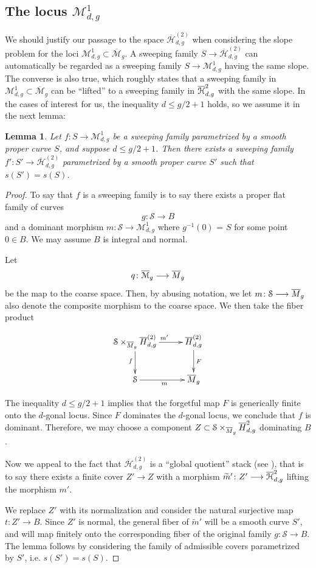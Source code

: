 \documentclass[reqno, 10 pt]{article}
\newtheorem{lem}[thm]{Lemma}
\theoremstyle{definition}
\theoremstyle{remark}
\numberwithin{equation}{section}
\numberwithin{thm}{section}
\numberwithin{prop}{section}
\numberwithin{lem}{section}
\numberwithin{cor}{section}
\numberwithin{conj}{section}
\numberwithin{defn}{section}
\newcommand{\M}{\mathcal M}
\renewcommand{\H}{\mathcal H}
\newcommand{\Hdgnt}{\overline{\H}_{d,g}^{(2)}}
\renewcommand{\to}{\longrightarrow}
\newcommand{\Mg}{{\overline{\mathcal{M}}_{g}}}
\newcommand{\cS}{{\mathcal S}}
\newcommand {\from}{{\colon}}
\renewcommand{\H}{{\mathcal{H}}}
\begin{document}
\subsection{The locus $\M^{1}_{d,g}$}
We should justify our passage to the space $\Hdgnt$ when considering the slope problem for the loci $\M^{1}_{d,g} \subset \Mg$.  A sweeping family $S \to \Hdgnt$ can automatically be regarded as a sweeping family $S \to \M^{1}_{d,g}$ having the same slope. The converse is also true, which roughly states that a sweeping family in $\M^{1}_{d,g} \subset \Mg$ can be ``lifted''  to a sweeping family in $\o {\H}_{d,g}^{2}$ with the same slope.  In the cases of interest for us, the inequality $d \leq g/2 +1$ holds, so we assume it in the next lemma: 
\begin{lem}\label{transportsweeping}
Let $f \from S \to \M^{1}_{d,g}$ be a sweeping family parametrized by a smooth proper curve $S$, and suppose $d \leq g/2 +1$. Then there exists a sweeping family $f' \from S' \to \Hdgnt$ parametrized by a smooth proper curve $S'$ such that $s(S') = s(S)$. 
\end{lem}
\begin{proof}
To say that $f$ is a sweeping family is to say there exists a proper flat family of curves \[g \from \cS \to B\] and a dominant morphism $m \from \cS \to \M^{1}_{d,g}$ where $g^{-1}(0)$ = $S$ for some point $0 \in B$.  We may assume $B$ is integral and normal.  

Let \[q \from \Mg \to \o{M}_{g}\] be the map to the coarse space.  Then, by abusing notation, we let $m \from \cS \to \o{M}_{g}$ also denote the composite morphism to the coarse space. We  then take the fiber product 

 \begin{equation} 
\xymatrix @C -1.1pc  {
\cS \times_{\o{M}_g} \o{H}_{d,g}^{(2)} \ar[rr]^{m'} \ar[d]_f&&
\o{H}_{d,g}^{(2)} \ar[d]^F \\
\cS \ar[rr]_{m} && \o{M}_{g}}
 \end{equation} 

The inequality $d \leq g/2 + 1$ implies that the forgetful map $F$ is generically finite onto the $d$-gonal locus.  Since $F$ dominates the $d$-gonal locus, we conclude that $f$ is dominant.  Therefore, we may choose a component $Z \subset \cS \times_{\o{M}_g} \o{H}_{d,g}^{2}$ dominating $B$.  

Now we appeal to the fact that $\Hdgnt$ is a ``global quotient'' stack (see \cite{edidin01:_brauer}), that is to say there exists a finite cover $Z' \to Z$ with a morphism $\widetilde{m}' \from Z' \to \o {\H}_{d,g}^{2}$ lifting the morphism $m'$.  

We replace $Z'$ with its normalization and consider the natural surjective map $t \from Z' \to B$.  Since $Z'$ is normal, the general fiber of $\widetilde{m}'$ will be a smooth curve $S'$, and  will map finitely onto the corresponding fiber of the original family $g \from \cS \to B$.  The lemma follows by considering the family of admissible covers parametrized by $S'$, i.e. $s(S') = s(S)$.  
\end{proof}
\end{document}
